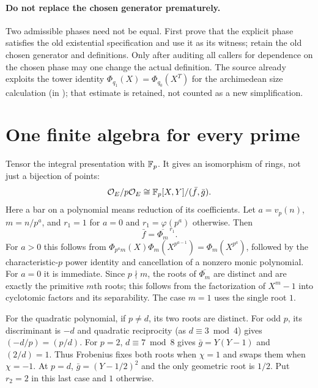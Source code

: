 \documentclass[11pt]{article}
\begin{document}
\paragraph{Do not replace the chosen generator prematurely.} Two admissible phases need not be equal. First prove that the explicit phase satisfies the old existential specification and use it as its witness; retain the old chosen generator and definitions. Only after auditing all callers for dependence on the chosen phase may one change the actual definition. The source already exploits the tower identity $\Phi_{q_1}(X)=\Phi_{q_0}(X^T)$ for the archimedean size calculation (in ); that estimate is retained, not counted as a new simplification.

\section{One finite algebra for every prime}
Tensor the integral presentation with $\mathbb F_p$. It gives an isomorphism of rings, not just a bijection of points:
\begin{equation}\label{eq:finite}
 \mathcal O_E/p\mathcal O_E\cong\mathbb F_p[X,Y]/(\bar f,\bar g).
\end{equation}
Here a bar on a polynomial means reduction of its coefficients. Let $a=v_p(n)$, $m=n/p^a$, and $r_1=1$ for $a=0$ and $r_1=\varphi(p^a)$ otherwise. Then
\[
 \bar f=\overline{\Phi_m}^{\,r_1}.
\]
For $a>0$ this follows from $\Phi_{p^a m}(X)\Phi_m(X^{p^{a-1}})=\Phi_m(X^{p^a})$, followed by the characteristic-$p$ power identity and cancellation of a nonzero monic polynomial. For $a=0$ it is immediate. Since $p\nmid m$, the roots of $\overline{\Phi_m}$ are distinct and are exactly the primitive $m$th roots; this follows from the factorization of $X^m-1$ into cyclotomic factors and its separability. The case $m=1$ uses the single root $1$.

For the quadratic polynomial, if $p\ne d$, its two roots are distinct. For odd $p$, its discriminant is $-d$ and quadratic reciprocity (as $d\equiv3\bmod4$) gives $(-d/p)=(p/d)$. For $p=2$, $d\equiv7\bmod8$ gives $\bar g=Y(Y-1)$ and $(2/d)=1$. Thus Frobenius fixes both roots when $\chi=1$ and swaps them when $\chi=-1$. At $p=d$, $\bar g=(Y-1/2)^2$ and the only geometric root is $1/2$. Put $r_2=2$ in this last case and $1$ otherwise.
\end{document}
